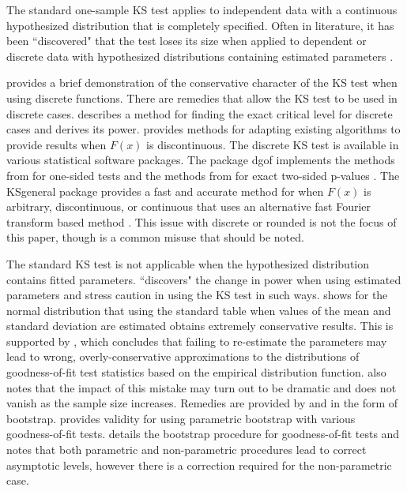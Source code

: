 \documentclass[12pt, letterpaper, titlepage]{article}
\begin{document}
The standard one-sample KS test applies to independent data with a continuous
hypothesized distribution that is completely specified. Often in literature, it 
has been ``discovered" that the test loses its size when applied to dependent 
or discrete data with hypothesized distributions containing estimated parameters 
\citep{Steinskog}. 

\citet{Noether} provides a brief demonstration of the 
conservative character of the KS test when using discrete functions. 
There are remedies that allow the KS test to be used in discrete cases. 
\citet{Conover} describes a method for finding the exact critical level for 
discrete cases and derives its power. \citet{Gleser} provides methods for 
adapting existing algorithms to provide results when $F(x)$ is discontinuous.
The discrete KS test is available in various statistical software packages.
The package \textsf{dgof} implements the methods from \citet{Conover} for 
one-sided tests and the methods from \citet{Gleser} for exact two-sided 
p-values \citep{Arnold}. The \textsf{KSgeneral} package provides a fast and 
accurate method for when $F(x)$ is arbitrary, discontinuous, or continuous that 
uses an alternative fast Fourier transform based method \citep{Dimitrova}.
This issue with discrete or rounded is not the focus of this paper, though is a
common misuse that should be noted.

The standard KS test is not applicable when the hypothesized distribution 
contains fitted parameters. \citet{Steinskog} ``discovers" the change in power 
when using estimated parameters and stress caution in using the KS test in such 
ways. \citet{Lilliefors} shows for the normal distribution that using the 
standard table when values of the mean and standard deviation are estimated 
obtains extremely conservative results. This is supported by \citet{Capasso}, 
which concludes that failing to re-estimate the parameters may lead to wrong, 
overly-conservative approximations to the distributions of goodness-of-fit test 
statistics based on the empirical distribution function. \citet{Capasso} also 
notes that the impact of this mistake may turn out to be dramatic and does not 
vanish as the sample size increases. Remedies are provided by \citet{Genest} and
\citet{Babu} in the form of bootstrap. \citet{Genest} provides validity for 
using parametric bootstrap with various goodness-of-fit tests. \citet{Babu} 
details the bootstrap procedure for goodness-of-fit tests and notes that both 
parametric and non-parametric procedures lead to correct asymptotic levels, 
however there is a correction required for the non-parametric case. 
\end{document}
